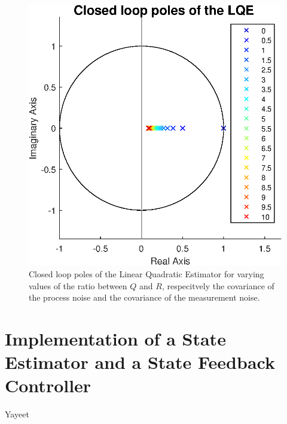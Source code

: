 \documentclass[a4paper,kul]{kulakarticle} %
\begin{document}
\begin{figure}[htp!]
	\centering
	\includegraphics[width=0.5\linewidth]{poles_LQE.eps}
	\caption{Closed loop poles of the Linear Quadratic Estimator for varying values of the ratio between $Q$ and $R$, respecitvely the covariance of the process noise and the covariance of the measurement noise.}
	\label{fig:poles_LQE}
\end{figure}



\newpage
\section{Implementation of a State Estimator and a State Feedback Controller}

Yayeet


\newpage


\end{document}
